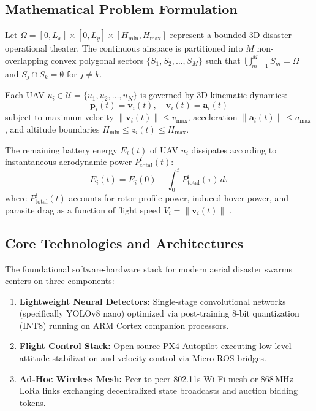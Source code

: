 \documentclass[journal]{IEEEtran}
\begin{document}
\subsection{Mathematical Problem Formulation}
Let $\Omega = [0, L_x] \times [0, L_y] \times [H_{\min}, H_{\max}]$ represent a bounded 3D disaster operational theater. The continuous airspace is partitioned into $M$ non-overlapping convex polygonal sectors $\{S_1, S_2, \dots, S_M\}$ such that $\bigcup_{m=1}^M S_m = \Omega$ and $S_j \cap S_k = \emptyset$ for $j \neq k$.

Each UAV $u_i \in \mathcal{U} = \{u_1, u_2, \dots, u_N\}$ is governed by 3D kinematic dynamics:
\begin{equation}
\dot{\mathbf{p}}_i(t) = \mathbf{v}_i(t), \quad \dot{\mathbf{v}}_i(t) = \mathbf{a}_i(t)
\label{eq_kinematics}
\end{equation}
subject to maximum velocity $\|\mathbf{v}_i(t)\| \le v_{\max}$, acceleration $\|\mathbf{a}_i(t)\| \le a_{\max}$, and altitude boundaries $H_{\min} \le z_i(t) \le H_{\max}$.

The remaining battery energy $E_i(t)$ of UAV $u_i$ dissipates according to instantaneous aerodynamic power $P_{\text{total}}^i(t)$:
\begin{equation}
E_i(t) = E_i(0) - \int_0^t P_{\text{total}}^i(\tau) \, d\tau
\label{eq_battery}
\end{equation}
where $P_{\text{total}}^i(t)$ accounts for rotor profile power, induced hover power, and parasite drag as a function of flight speed $V_i = \|\mathbf{v}_i(t)\|$ \cite{21}.

\subsection{Core Technologies and Architectures}
The foundational software-hardware stack for modern aerial disaster swarms centers on three components:
\begin{enumerate}
    \item \textbf{Lightweight Neural Detectors:} Single-stage convolutional networks (specifically YOLOv8 nano) optimized via post-training 8-bit quantization (INT8) running on ARM Cortex companion processors.
    \item \textbf{Flight Control Stack:} Open-source PX4 Autopilot executing low-level attitude stabilization and velocity control via Micro-ROS bridges.
    \item \textbf{Ad-Hoc Wireless Mesh:} Peer-to-peer 802.11s Wi-Fi mesh or 868\,MHz LoRa links exchanging decentralized state broadcasts and auction bidding tokens.
\end{enumerate}
\end{document}
